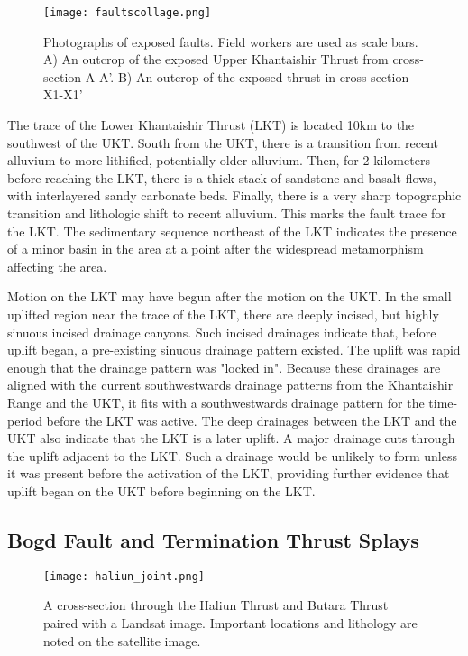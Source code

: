 \begin{figure}[h!]
  \centering
  \texttt{[image: faultscollage.png]}
  \caption{Photographs of exposed faults. Field workers are used as scale bars. A) An outcrop of the exposed Upper Khantaishir Thrust from cross-section A-A'. B) An outcrop of the exposed thrust in cross-section X1-X1'}
  \label{faultzones}
\end{figure}


The trace of the Lower Khantaishir Thrust (LKT) is located 10km to the southwest of the UKT. South from the UKT, there is a transition from recent alluvium to more lithified, potentially older alluvium. Then, for 2 kilometers before reaching the LKT, there is a thick stack of sandstone and basalt flows, with interlayered sandy carbonate beds. Finally, there is a very sharp topographic transition and lithologic shift to recent alluvium. This marks the fault trace for the LKT. The sedimentary sequence northeast of the LKT indicates the presence of a minor basin in the area at a point after the widespread metamorphism affecting the area.

Motion on the LKT may have begun after the motion on the UKT. In the small uplifted region near the trace of the LKT, there are deeply incised, but highly sinuous incised drainage canyons. Such incised drainages indicate that, before uplift began, a pre-existing sinuous drainage pattern existed. The uplift was rapid enough that the drainage pattern was "locked in". Because these drainages are aligned with the current southwestwards drainage patterns from the Khantaishir Range and the UKT, it fits with a southwestwards drainage pattern for the time-period before the LKT was active. The deep drainages between the LKT and the UKT also indicate that the LKT is a later uplift. A major drainage cuts through the uplift adjacent to the LKT. Such a drainage would be unlikely to form unless it was present before the activation of the LKT, providing further evidence that uplift began on the UKT before beginning on the LKT.

\subsection{Bogd Fault and Termination Thrust Splays}


\begin{figure}[h!]
  \centering
  \texttt{[image: haliun\_joint.png]}
  \caption{A cross-section through the Haliun Thrust and Butara Thrust paired with a Landsat image. Important locations and lithology are noted on the satellite image.}
  \label{haliun_joint}
\end{figure}

